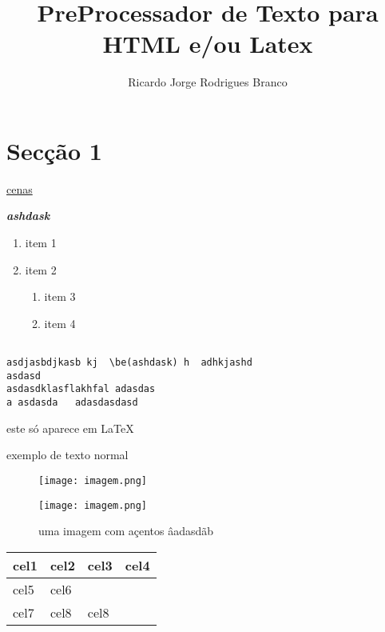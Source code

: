 \documentclass[10pt]{article}
\title{PreProcessador de Texto para HTML e/ou Latex}
\author{Ricardo Jorge Rodrigues Branco}
\begin{document}
\maketitle


\section{Secção 1}

\href{www.google.pt}{cenas}

\textbf{\emph{ashdask}}
\begin{enumerate}
\item item 1
\item item 2
\begin{enumerate}
\item item 3 
\item item 4
\end{enumerate}
\end{enumerate}

\begin{verbatim}

asdjasbdjkasb kj  \be(ashdask) h  adhkjashd    
asdasd
asdasdklasflakhfal adasdas 
a asdasda   adasdasdasd
\end{verbatim}


\begin{comment}

comentario
\end{comment}



este só aparece em \LaTeX
 
exemplo de texto normal
\begin{figure}[!hbp]
\texttt{[image: imagem.png]}
\caption{uma imagem com açentos âadasdãb}
\texttt{[image: imagem.png]}
\end{figure}


\begin{tabular}{|l|l|l|l|}
\hline
cel1 & cel2 & cel3 & cel4\\
\hline
cel5 & cel6 &  & \\
\hline
cel7 & cel8  & cel8 & \\
\hline
\end{tabular}
\end{document}
